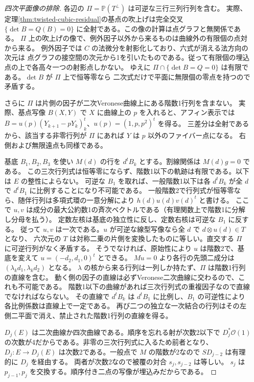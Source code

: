 \begin{proof}[四次平面像の排除]
各辺の $\Pi=\mathbb P(T^\perp)$ は可逆な三行三列行列を含む。
実際、定理\ref{thm:twisted-cubic-residual}の基点の吹上げは完全交叉
$\{\det B=Q(B)=0\}$ に全射である。この像の計算は点グラフと無関係である。
$\Pi$ 上の吹上げの像で、例外因子以外から来るものは曲線外の有限個の点対から来る。
例外因子では $C$ の法微分を射影化しており、六式が消える法方向の次元は
点グラフの接空間の次元から1を引いたものである。従って有限個の埋込点の上で各高々一つの射影点しかない。
ゆえに $\Pi\cap\{\det B=Q=0\}$ は有限である。$\det B$ が $\Pi$ 上で恒等零なら
二次式だけで平面に無限個の零点を持つので矛盾する。

さらに $\Pi$ は片側の因子が二次Veronese曲線上にある階数1行列を含まない。
実際、基点写像 $B(X,Y)$ で $X$ に曲線上の $p$ を入れると、アフィン表示では
$B=u(p)(Y_{k+1}-pY_k)_k^t$、$u(p)=(1,p,p^2)^t$ を得る。
三差分は全射であるから、該当する非零行列が $\Pi$ にあれば $Y$ は $p$ 以外のファイバー点になる。
右側および無限遠点も同様である。

基底 $B_1,B_2,B_3$ を使い $M(d)$ の行を $d^t B_k$ とする。割線関係は $M(d)g=0$ である。
この三次行列式は恒等零にならず、階数1以下の軌跡は有限である。以下は $E$ の整性によらない。
可逆な $B_1$ を取れば、一般階数1以下は各 $d^t B_k$ が全 $d$ で $d^t B_1$ に比例することになり不可能である。
一般階数2で行列式が恒等零なら、随伴行列は多項式環の一意分解により $h(d)u(d)v(d)^t$ と書ける。
ここで $u,v$ は成分の最大公約数1の斉次ベクトルである（有理関数上で階数1に分解し分母を払う）。
定数左核は基底の独立性に反し、定数右核は可逆な $B_1$ に反する。
従って $u,v$ は一次である。$u$ が可逆な線型写像なら全 $d$ で $d\otimes u(d)\in T$ となり、
六次元の $T$ は対称二乗の片側を変換したものに等しい。直交する $\Pi$ に可逆行列がなく矛盾する。
そうでなければ、原始性により $u$ は階数2で、基底を変えて $u=(-d_2,d_1,0)^t$ とできる。
$M u=0$ より各行の先頭二成分は $(\lambda_k d_1,\lambda_k d_2)$ となる。
$\lambda$ の核から来る行列は一列しか持たず、$\Pi$ は階数1行列の直線を含む。
動く側の因子の直線は必ずVeronese二次曲線に交わるので、これも不可能である。
階数1以下の曲線があれば三次行列式の重複因子なので直線でなければならない。
その直線で $d^t B_k$ は $d^t B_1$ に比例し、$B_1$ の可逆性により各比例係数は直線上で一定である。
再び二つの独立な一次結合の行列はその左側二平面で消え、禁止された階数1行列の直線を得る。

$D_j(E)$ は二次曲線か四次曲線である。順序を忘れる射が次数2以下で
$D_j^*\mathcal O(1)$ の次数が4だからである。非零の三次行列式に入るため前者となり、
$D_j:E\to D_j(E)$ は次数2である。一般点で $M$ の階数が2なので $S D_{j-2}$ は有理的に $D_j$ を経由する。
両者が次数2なので被覆の対合 $s_j,s_{j-2}$ は等しい。
$s_j$ は $p_{j-1},p_j$ を交換する。順序付き二点の写像が埋込みだからである。
\end{proof}

